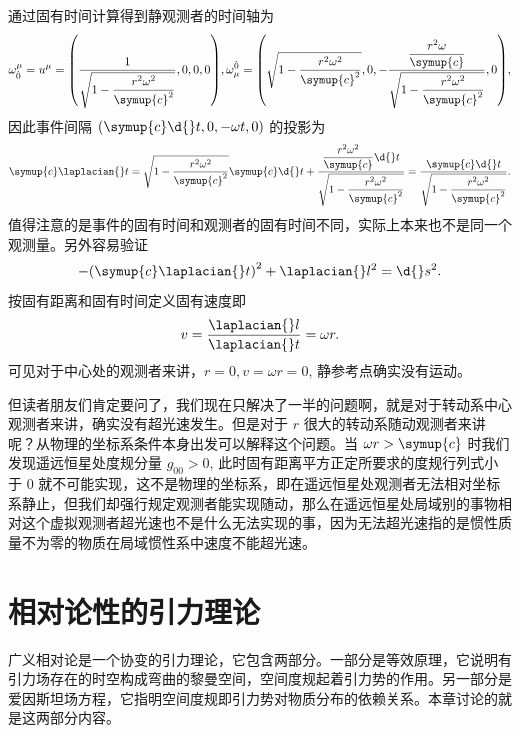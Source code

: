 \documentclass[UTF8, 12pt, a4paper, oneside, onecolumn, fontset=none]{ctexart}
\begin{document}
通过固有时间计算得到静观测者的时间轴为
\begin{align}
\omega_{\hat{0}}^{\mu}=u^{\mu}=\mleft(\frac{1}{\sqrt{1-\dfrac{r^{2}\omega^{2}}{\symup{c}^{2}}}}, 0, 0, 0\mright),\omega_{\mu}^{\hat{0}}=\mleft(\sqrt{1-\frac{r^{2}\omega^{2}}{\symup{c}^{2}}}, 0,-\frac{\dfrac{r^{2}\omega}{\symup{c}}}{\sqrt{1-\dfrac{r^{2}\omega^{2}}{\symup{c}^{2}}}}, 0\mright),
\end{align}
因此事件间隔 $\mleft(\symup{c}\d{}t, 0,-\omega t, 0\mright)$ 的投影为
\begin{equation}
\symup{c}\laplacian{}t=\sqrt{1-\frac{r^{2}\omega^{2}}{\symup{c}^{2}}}\symup{c}\d{}t+\frac{\dfrac{r^{2}\omega^{2}}{\symup{c}}\d{}t}{\sqrt{1-\dfrac{r^{2}\omega^{2}}{\symup{c}^{2}}}}=\frac{\symup{c}\d{}t}{\sqrt{1-\dfrac{r^{2}\omega^{2}}{\symup{c}^{2}}}}.
\end{equation}
值得注意的是事件的固有时间和观测者的固有时间不同，实际上本来也不是同一个观测量。另外容易验证
\begin{equation}
-\mleft(\symup{c}\laplacian{}t\mright)^{2}+\laplacian{}l^{2}=\d{}s^{2}.
\end{equation}
按固有距离和固有时间定义固有速度即
\begin{equation}
v=\frac{\laplacian{}l}{\laplacian{}t}=\omega r.
\end{equation}
可见对于中心处的观测者来讲，$r=0, v=\omega r=0$, 静参考点确实没有运动。

但读者朋友们肯定要问了，我们现在只解决了一半的问题啊，就是对于转动系中心观测者来讲，确实没有超光速发生。但是对于 $r$ 很大的转动系随动观测者来讲呢？从物理的坐标系条件本身出发可以解释这个问题。当 $\omega r>\symup{c}$ 时我们发现遥远恒星处度规分量 $g_{00}>0$, 此时固有距离平方正定所要求的度规行列式小于 0 就不可能实现，这不是物理的坐标系，即在遥远恒星处观测者无法相对坐标系静止，但我们却强行规定观测者能实现随动，那么在遥远恒星处局域别的事物相对这个虚拟观测者超光速也不是什么无法实现的事，因为无法超光速指的是惯性质量不为零的物质在局域惯性系中速度不能超光速。

\newpage
\section{相对论性的引力理论}
广义相对论是⼀个协变的引⼒理论，它包含两部分。⼀部分是等效原理，它说明有引⼒场存在的时空构成弯曲的黎曼空间，空间度规起着引⼒势的作⽤。另⼀部分是爱因斯坦场⽅程，它指明空间度规即引⼒势对物质分布的依赖关系。本章讨论的就是这两部分内容。
\end{document}
